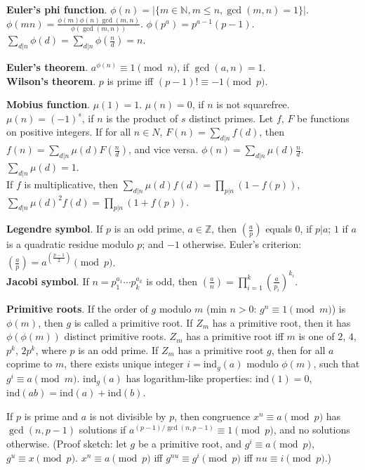 \documentclass[a4paper, 12pt]{article}
\let\le=\leqslant
\newcommand{\Topic}[1]{\textbf{#1}}
\begin{document}
\Topic{Euler's phi function}.
$\phi(n)=|\{m \in {\mathbb N}, m \le n, \gcd(m, n) = 1 \}|$. \\
$\phi(mn) = \frac{\phi(m) \phi(n) \gcd(m,n)}{\phi(\gcd(m,n))}$. \quad
$\phi(p^a) = p^{a-1} (p-1)$. \quad
$\sum_{d|n} \phi(d) = \sum_{d|n} \phi(\frac{n}{d}) = n$.

\Topic{Euler's theorem}. $a^{\phi(n)} \equiv 1\pmod{n}$, if $\gcd(a,n)=1$. \\
\Topic{Wilson's theorem}. $p$ is prime iff $(p - 1)! \equiv -1 \pmod p$.

\Topic{Mobius function}.
$\mu(1) = 1$. $\mu(n) = 0$, if $n$ is not squarefree.
$\mu(n) = (-1)^s$, if $n$ is the product of $s$ distinct primes.
Let $f$, $F$ be functions on positive integers.
If for all $n \in N$, $F(n)=\sum_{d|n} f(d)$, then $f(n) = \sum_{d|n} \mu(d) F(\frac{n}{d})$,
and vice versa. \quad
$\phi(n) = \sum_{d|n} \mu(d) \frac{n}{d}$.
\quad $\sum_{d|n} \mu(d) = 1$. \\
If $f$ is multiplicative, then $\sum_{d|n} \mu(d) f(d) = \prod_{p|n}(1-f(p))$,
$\sum_{d|n} \mu(d)^2 f(d) = \prod_{p|n} (1+f(p))$.

\Topic{Legendre symbol}. If $p$ is an odd prime, $a \in {\mathbb Z}$, then
$\left(\frac{a}{p}\right)$ equals $0$, if $p | a$; $1$ if $a$ is a quadratic
residue modulo $p$; and $-1$ otherwise. 
Euler's criterion:
$\left(\frac{a}{p}\right)=a^{\left(\frac{p-1}{2}\right)} \pmod p$. \\
\Topic{Jacobi symbol}.
If $n=p_1^{a_1} \cdots p_k^{a_k}$ is odd, then
$\left(\frac{a}{n}\right) = \prod_{i=1}^k \left(\frac{a}{p_i}\right)^{k_i}$.


\Topic{Primitive roots}.  If the order of $g$ modulo $m$ (min $n>0$:
$g^n \equiv 1 \pmod{m}$) is $\phi(m)$, then $g$ is called a primitive root.
If $Z_m$ has a primitive root, then it has $\phi(\phi(m))$ distinct primitive
roots. $Z_m$ has a primitive root iff $m$ is one of $2$, $4$,
$p^k$, $2p^k$, where $p$ is an odd prime.
If $Z_m$ has a primitive root $g$, then for all $a$ coprime to $m$,
there exists unique integer $i=\text{ind}_g(a)$ modulo $\phi(m)$,
such that $g^i \equiv a \pmod{m}$.
$\text{ind}_g(a)$ has logarithm-like properties:
$\text{ind}(1) = 0$, $\text{ind}(ab) = \text{ind}(a) + \text{ind}(b)$.

If $p$ is prime and $a$ is not divisible by $p$, then congruence
$x^n \equiv a \pmod{p}$ has $\gcd(n, p-1)$ solutions if 
$a^{(p-1)/\gcd(n,p-1)} \equiv 1 \pmod{p}$, and no solutions otherwise.
(Proof sketch: let $g$ be a primitive root, and
$g^i \equiv a \pmod{p}$, $g^u \equiv x \pmod{p}$.
$x^n \equiv a \pmod{p}$ iff $g^{nu} \equiv g^i \pmod{p}$ iff $nu \equiv i \pmod{p}$.)
\end{document}
